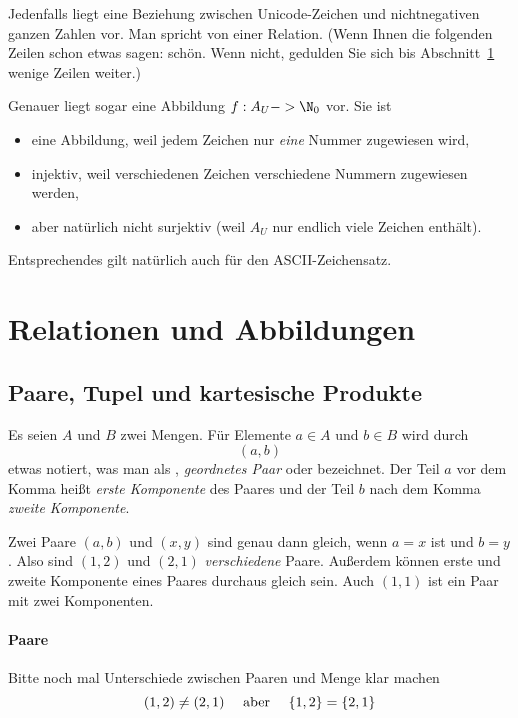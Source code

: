 Jedenfalls liegt eine Beziehung zwischen Unicode-Zeichen und
nichtnegativen ganzen Zahlen vor. Man spricht von einer Relation.
(Wenn Ihnen die folgenden Zeilen schon etwas sagen: schön. Wenn nicht,
gedulden Sie sich bis Abschnitt~\ref{subsec:rel-func} wenige Zeilen
weiter.)

Genauer liegt sogar eine Abbildung $f:A_U -> \N_0$ vor.  Sie ist
\begin{itemize}
\item eine Abbildung, weil jedem Zeichen nur \emph{eine} Nummer
  zugewiesen wird,
\item injektiv, weil verschiedenen Zeichen verschiedene Nummern
  zugewiesen werden,
\item aber natürlich nicht surjektiv (weil $A_U$ nur endlich viele
  Zeichen enthält).
\end{itemize}
%
Entsprechendes gilt natürlich auch für den ASCII-Zeichensatz.

\Tut\section{Relationen und Abbildungen}
\label{subsec:rel-func}

\Tut\subsection{Paare, Tupel und kartesische Produkte}

Es seien $A$ und $B$ zwei Mengen. Für Elemente $a\in A$ und $b\in B$ wird durch
\[
  (a,b)
\]
etwas notiert, was man als , \emph{geordnetes Paar} oder  bezeichnet.
%
Der Teil $a$ vor dem Komma heißt \emph{erste Komponente} des Paares und der Teil $b$ nach dem Komma \emph{zweite Komponente}.

Zwei Paare $(a,b)$ und $(x,y)$ sind genau dann gleich, wenn $a=x$ ist
und $b=y$.
%
Also sind $(1,2)$ und $(2,1)$ \emph{verschiedene} Paare.
%
Außerdem können erste und zweite Komponente eines Paares durchaus
gleich sein.
%
Auch $(1,1)$ ist ein Paar mit zwei Komponenten.
%
\begin{tutorium}
  \paragraph{Paare}

  Bitte noch mal Unterschiede zwischen Paaren und Menge klar machen
  \[
    (1,2) \not= (2,1) \text{ \quad aber \quad } \{1,2\} = \{2,1\}
  \]
\end{tutorium}

